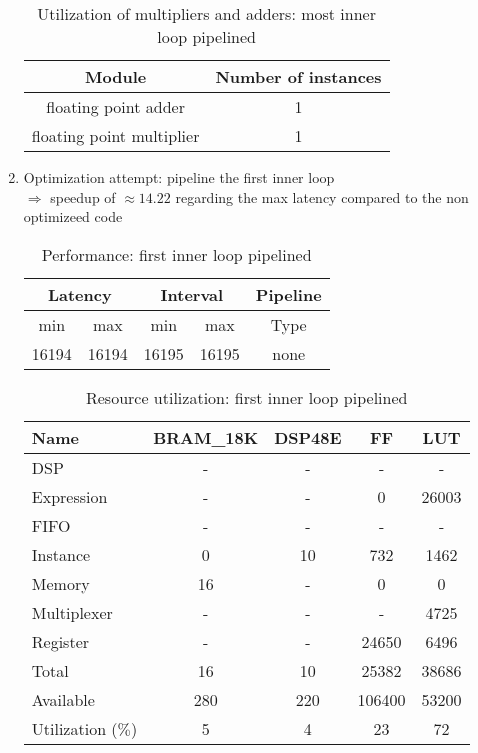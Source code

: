 \documentclass{article}
\begin{document}
\begin{enumerate}
	\begin{table}[H]
		\centering
		\begin{tabular}{cc}
			Module & Number of instances \\
			\hline
			floating point adder & 1 \\
			floating point multiplier & 1
		\end{tabular}
		\caption{Utilization of multipliers and adders: most inner loop pipelined}
		\label{1-a-resources-arithmetic-1}
	\end{table}


	\item Optimization attempt: pipeline the first inner loop \\
		\label{attempt2}
		$\Rightarrow$ speedup of $\approx 14.22 $ regarding the max latency compared to the non optimizeed code
	\begin{table}[H]
		\centering
		\begin{tabular}{ccccc}
			\multicolumn{2}{c}{Latency} & \multicolumn{2}{c}{Interval} & Pipeline\\
			\hline
			min  &   max  &   min  &   max  &   Type  \\
			16194&  16194&  16195&  16195&   none  
		\end{tabular}
		\caption{Performance: first inner loop pipelined}
		\label{1-b-perf-table-2}
	\end{table}

	\begin{table}[H]
		\centering
		\begin{tabular}{lcccc}
			Name      & BRAM\_18K& DSP48E&   FF   &  LUT  \\
			\hline
			DSP              &        -&      -&       -&      -\\
			Expression       &        -&      -&       0&  26003\\
			FIFO             &        -&      -&       -&      -\\
			Instance         &        0&     10&     732&   1462\\
			Memory           &       16&      -&       0&      0\\
			Multiplexer      &        -&      -&       -&   4725\\
			Register         &        -&      -&   24650&   6496\\
			\hline
			Total            &       16&     10&   25382&  38686\\
			Available        &      280&    220&  106400&  53200\\
			\hline
			Utilization ($\%$)  &        5&      4&      23&     72
		\end{tabular}
		\caption{Resource utilization: first inner loop pipelined}
		\label{1-b-resources-2}
	\end{table}


\end{enumerate}
\end{document}
